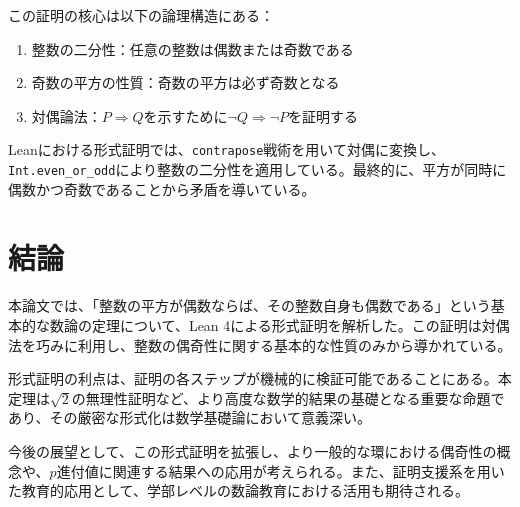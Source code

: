 \documentclass[uplatex, a4paper]{jlreq}
\begin{document}
この証明の核心は以下の論理構造にある：

\begin{enumerate}
    \item 整数の二分性：任意の整数は偶数または奇数である
    \item 奇数の平方の性質：奇数の平方は必ず奇数となる
    \item 対偶論法：$P \Rightarrow Q$を示すために$\neg Q \Rightarrow \neg P$を証明する
\end{enumerate}

Leanにおける形式証明では、\texttt{contrapose}戦術を用いて対偶に変換し、\texttt{Int.even\_or\_odd}により整数の二分性を適用している。最終的に、平方が同時に偶数かつ奇数であることから矛盾を導いている。

\section{結論}

本論文では、「整数の平方が偶数ならば、その整数自身も偶数である」という基本的な数論の定理について、Lean 4による形式証明を解析した。この証明は対偶法を巧みに利用し、整数の偶奇性に関する基本的な性質のみから導かれている。

形式証明の利点は、証明の各ステップが機械的に検証可能であることにある。本定理は$\sqrt{2}$の無理性証明など、より高度な数学的結果の基礎となる重要な命題であり、その厳密な形式化は数学基礎論において意義深い。

今後の展望として、この形式証明を拡張し、より一般的な環における偶奇性の概念や、$p$進付値に関連する結果への応用が考えられる。また、証明支援系を用いた教育的応用として、学部レベルの数論教育における活用も期待される。
\end{document}
